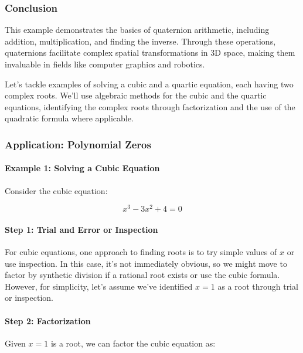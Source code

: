 \documentclass[
]{article}
\begin{document}
\subsubsection{Conclusion}\label{conclusion-2}

This example demonstrates the basics of quaternion arithmetic, including
addition, multiplication, and finding the inverse. Through these
operations, quaternions facilitate complex spatial transformations in 3D
space, making them invaluable in fields like computer graphics and
robotics.

Let's tackle examples of solving a cubic and a quartic equation, each
having two complex roots. We'll use algebraic methods for the cubic and
the quartic equations, identifying the complex roots through
factorization and the use of the quadratic formula where applicable.

\subsubsection{Application: Polynomial
Zeros}\label{application-polynomial-zeros}

\paragraph{Example 1: Solving a Cubic
Equation}\label{example-1-solving-a-cubic-equation}

Consider the cubic equation:

\[ x^3 - 3x^2 + 4 = 0 \]

\paragraph{Step 1: Trial and Error or
Inspection}\label{step-1-trial-and-error-or-inspection}

For cubic equations, one approach to finding roots is to try simple
values of \(x\) or use inspection. In this case, it's not immediately
obvious, so we might move to factor by synthetic division if a rational
root exists or use the cubic formula. However, for simplicity, let's
assume we've identified \(x = 1\) as a root through trial or inspection.

\paragraph{Step 2: Factorization}\label{step-2-factorization}

Given \(x = 1\) is a root, we can factor the cubic equation as:
\end{document}
